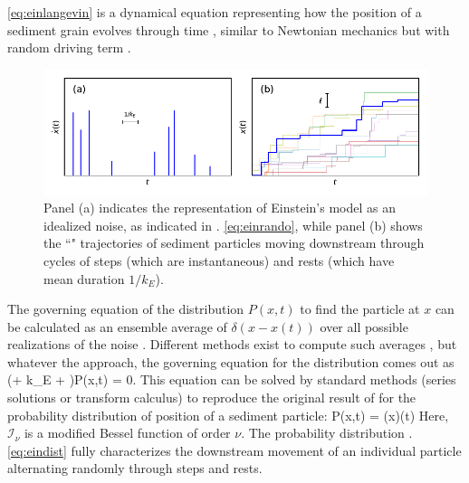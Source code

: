 \DIFdelbegin {}\DIFdelend \DIFaddbegin {}\DIFaddend \ref{eq:einlangevin} is a \DIFdelbegin {}\DIFdelend dynamical equation representing how the position of a sediment grain evolves through time \citep{Kubo1978}, similar to Newtonian mechanics \citep{Goldstein1997} but with random driving term \DIFdelbegin {}\DIFdelend \DIFaddbegin \DIFadd{\ref{eq:einrando}}\DIFaddend .
\begin{figure}[!htbp]
	\includegraphics[width=\linewidth,keepaspectratio]{./figures/ch1/einsteinConcept.pdf}
	\caption{Panel (a) indicates the representation of Einstein's model as an idealized \DIFdelbeginFL {}\DIFdelendFL \DIFaddbeginFL {}\DIFaddendFL noise\DIFdelbeginFL {}\DIFdelendFL , as indicated in \DIFdelbeginFL {}\DIFdelendFL \DIFaddbeginFL {}\DIFaddendFL . \ref{eq:einrando}, while panel (b) shows the ``\DIFdelbeginFL {}\DIFdelendFL \DIFaddbeginFL {}\DIFaddendFL " trajectories of sediment particles moving downstream through cycles of steps (which are instantaneous) and rests (which have mean duration $1/k_E$). }
	\label{fig:einsteinfig}
\end{figure}

The governing equation of the distribution $P(x,t)$ to find the particle at $x$ can be calculated as an ensemble average of $\delta(x-x(t))$ over all possible realizations of the noise \citep{Risken1989,Moss1989}. Different methods exist to compute such averages \citep{Hanggi1978, Hanggi1984a, Balakrishnan1993, VanDenBroeck1983}, but whatever the approach, the governing equation for the distribution comes out as
\be  \big(\ell \px \pt + k_E \ell \px + \pt \big)P(x,t) = 0. \label{eq:einmaster}\ee
This equation can be solved by standard methods (series solutions or transform calculus) \citep{Arfken1985,Prudnikov1992a} to reproduce the original result of \citet{Einstein1937} for the probability distribution of position of a sediment particle:
\be P(x,t) = \theta(x)\theta(t)\DIFaddbegin {}\DIFaddend \label{eq:eindist} \ee
Here, $\mathcal{I}_\nu$ is a modified Bessel function of order $\nu$. 
The probability distribution \DIFdelbegin {}\DIFdelend \DIFaddbegin {}\DIFaddend . \ref{eq:eindist} fully characterizes the downstream movement of an individual particle alternating randomly through steps and rests.


